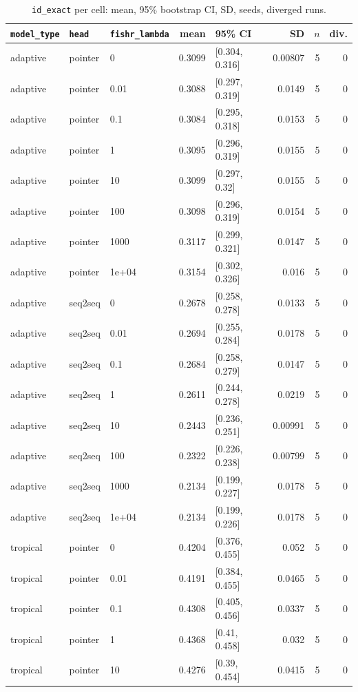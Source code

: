 \documentclass[10pt]{article}
\begin{document}
{\small
\begin{longtable}{lllrlrrr}
\caption{\texttt{id\_exact} per cell: mean, 95\% bootstrap CI, SD, seeds, diverged runs.}\label{tab:summary-id_exact}\\
\toprule
\texttt{model\_type} & \texttt{head} & \texttt{fishr\_lambda} & mean & 95\% CI & SD & $n$ & div.\\
\midrule
\endhead
adaptive & pointer & 0 & 0.3099 & [0.304, 0.316] & 0.00807 & 5 & 0\\
adaptive & pointer & 0.01 & 0.3088 & [0.297, 0.319] & 0.0149 & 5 & 0\\
adaptive & pointer & 0.1 & 0.3084 & [0.295, 0.318] & 0.0153 & 5 & 0\\
adaptive & pointer & 1 & 0.3095 & [0.296, 0.319] & 0.0155 & 5 & 0\\
adaptive & pointer & 10 & 0.3099 & [0.297, 0.32] & 0.0155 & 5 & 0\\
adaptive & pointer & 100 & 0.3098 & [0.296, 0.319] & 0.0154 & 5 & 0\\
adaptive & pointer & 1000 & 0.3117 & [0.299, 0.321] & 0.0147 & 5 & 0\\
adaptive & pointer & 1e+04 & 0.3154 & [0.302, 0.326] & 0.016 & 5 & 0\\
adaptive & seq2seq & 0 & 0.2678 & [0.258, 0.278] & 0.0133 & 5 & 0\\
adaptive & seq2seq & 0.01 & 0.2694 & [0.255, 0.284] & 0.0178 & 5 & 0\\
adaptive & seq2seq & 0.1 & 0.2684 & [0.258, 0.279] & 0.0147 & 5 & 0\\
adaptive & seq2seq & 1 & 0.2611 & [0.244, 0.278] & 0.0219 & 5 & 0\\
adaptive & seq2seq & 10 & 0.2443 & [0.236, 0.251] & 0.00991 & 5 & 0\\
adaptive & seq2seq & 100 & 0.2322 & [0.226, 0.238] & 0.00799 & 5 & 0\\
adaptive & seq2seq & 1000 & 0.2134 & [0.199, 0.227] & 0.0178 & 5 & 0\\
adaptive & seq2seq & 1e+04 & 0.2134 & [0.199, 0.226] & 0.0178 & 5 & 0\\
tropical & pointer & 0 & 0.4204 & [0.376, 0.455] & 0.052 & 5 & 0\\
tropical & pointer & 0.01 & 0.4191 & [0.384, 0.455] & 0.0465 & 5 & 0\\
tropical & pointer & 0.1 & 0.4308 & [0.405, 0.456] & 0.0337 & 5 & 0\\
tropical & pointer & 1 & 0.4368 & [0.41, 0.458] & 0.032 & 5 & 0\\
tropical & pointer & 10 & 0.4276 & [0.39, 0.454] & 0.0415 & 5 & 0\\

\end{longtable}}
\end{document}
